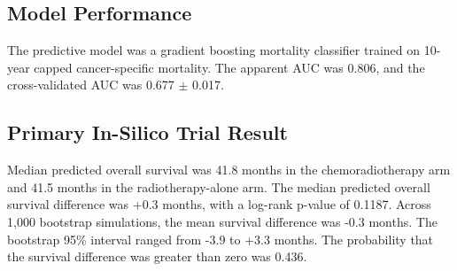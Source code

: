 \documentclass[10pt,twocolumn]{article}
\begin{document}
\subsection{Model Performance}
The predictive model was a gradient boosting mortality classifier trained on 10-year capped cancer-specific mortality. The apparent AUC was 0.806, and the cross-validated AUC was 0.677 $\pm$ 0.017.


\subsection{Primary In-Silico Trial Result}
Median predicted overall survival was 41.8 months in the chemoradiotherapy arm and 41.5 months in the radiotherapy-alone arm. The median predicted overall survival difference was +0.3 months, with a log-rank p-value of 0.1187. Across 1,000 bootstrap simulations, the mean survival difference was -0.3 months. The bootstrap 95\% interval ranged from -3.9 to +3.3 months. The probability that the survival difference was greater than zero was 0.436.
\end{document}
